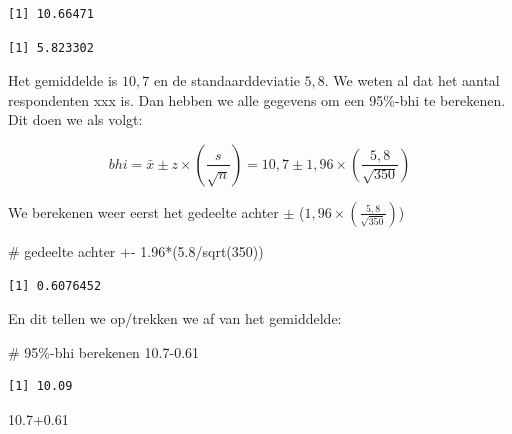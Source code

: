 \documentclass[
  letterpaper,
  DIV=11,
  numbers=noendperiod]{scrreprt}
\newenvironment{Shaded}{\begin{snugshade}}{\end{snugshade}}
\newcommand{\AttributeTok}[1]{\textcolor[rgb]{0.40,0.45,0.13}{#1}}
\newcommand{\CommentTok}[1]{\textcolor[rgb]{0.37,0.37,0.37}{#1}}
\newcommand{\ConstantTok}[1]{\textcolor[rgb]{0.56,0.35,0.01}{#1}}
\newcommand{\DecValTok}[1]{\textcolor[rgb]{0.68,0.00,0.00}{#1}}
\newcommand{\FloatTok}[1]{\textcolor[rgb]{0.68,0.00,0.00}{#1}}
\newcommand{\FunctionTok}[1]{\textcolor[rgb]{0.28,0.35,0.67}{#1}}
\newcommand{\NormalTok}[1]{\textcolor[rgb]{0.00,0.23,0.31}{#1}}
\newcommand{\SpecialCharTok}[1]{\textcolor[rgb]{0.37,0.37,0.37}{#1}}
\begin{document}
\begin{verbatim}
[1] 10.66471
\end{verbatim}

\begin{Shaded}
\end{Shaded}

\begin{verbatim}
[1] 5.823302
\end{verbatim}

Het gemiddelde is \(10,7\) en de standaarddeviatie \(5,8\). We weten al
dat het aantal respondenten xxx is. Dan hebben we alle gegevens om een
95\%-bhi te berekenen. Dit doen we als volgt:

\[ bhi = \bar{x} \pm z\times(\frac{s}{\sqrt{n}}) =10,7 \pm 1,96\times(\frac{5,8}{\sqrt{350}})  \]

We berekenen weer eerst het gedeelte achter \(\pm\)
(\(1,96\times(\frac{5,8}{\sqrt{350}})\))

\begin{Shaded}
\begin{Highlighting}[]
\CommentTok{\# gedeelte achter +{-}}
\FloatTok{1.96}\SpecialCharTok{*}\NormalTok{(}\FloatTok{5.8}\SpecialCharTok{/}\FunctionTok{sqrt}\NormalTok{(}\DecValTok{350}\NormalTok{))}
\end{Highlighting}
\end{Shaded}

\begin{verbatim}
[1] 0.6076452
\end{verbatim}

En dit tellen we op/trekken we af van het gemiddelde:

\begin{Shaded}
\begin{Highlighting}[]
\CommentTok{\# 95\%{-}bhi berekenen}
\FloatTok{10.7{-}0.61}
\end{Highlighting}
\end{Shaded}

\begin{verbatim}
[1] 10.09
\end{verbatim}

\begin{Shaded}
\begin{Highlighting}[]
\FloatTok{10.7+0.61}
\end{Highlighting}
\end{Shaded}
\end{document}
